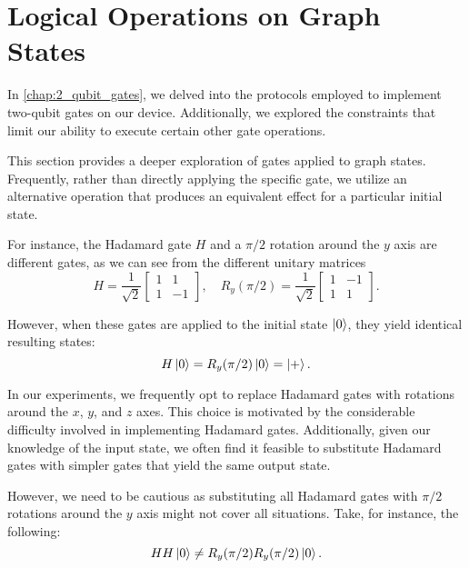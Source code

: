 \section{Logical Operations on Graph States}
\label{Sec:log_operation_graph}

In \cref{chap:2_qubit_gates}, we delved into the protocols employed to implement two-qubit gates on our device.
Additionally, we explored the constraints that limit our ability to execute certain other gate operations.

This section provides a deeper exploration of gates applied to graph states. 
Frequently, rather than directly applying the specific gate, we utilize an alternative operation that produces an equivalent effect for a particular initial state.

For instance, the Hadamard gate $H$ and a $\pi / 2$ rotation around the $y$ axis are different gates, as we can see from the different unitary matrices
\begin{equation}
    H = \frac{1}{\sqrt{2}}
    \begin{bmatrix}
        1 & 1 \\
        1 & -1
    \end{bmatrix} , \quad
    R_y(\pi / 2) = \frac{1}{\sqrt{2}}
    \begin{bmatrix}
        1 & -1 \\
        1 & 1
    \end{bmatrix} .
\end{equation}

However, when these gates are applied to the initial state $\ket{0}$, they yield identical resulting states:
\begin{equation}
    H \ket{0} = R_y(\pi/2) \ket{0} = \ket{+} .
\end{equation}

In our experiments, we frequently opt to replace Hadamard gates with rotations around the $x$, $y$, and $z$ axes. 
This choice is motivated by the considerable difficulty involved in implementing Hadamard gates.
Additionally, given our knowledge of the input state, we often find it feasible to substitute Hadamard gates with simpler gates that yield the same output state.

However, we need to be cautious as substituting all Hadamard gates with $\pi / 2$ rotations around the $y$ axis might not cover all situations. 
Take, for instance, the following:
\begin{equation}
    H H \ket{0} \neq
    R_y(\pi / 2) R_y(\pi / 2) \ket{0} .
\end{equation}

